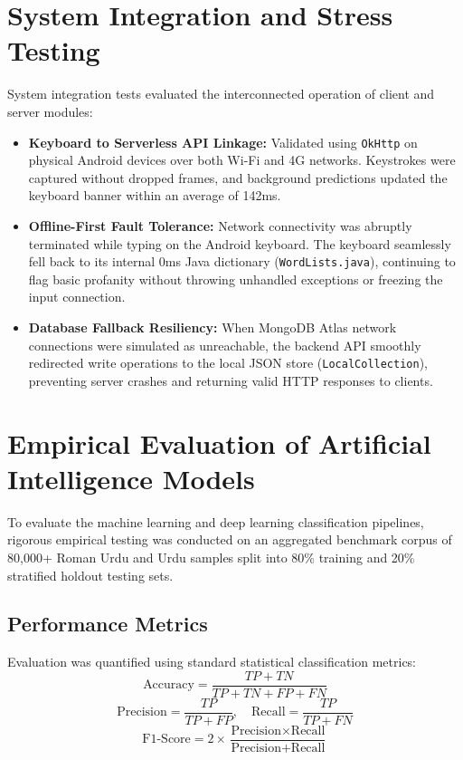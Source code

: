 \documentclass[A4paper,12pt]{report}
\theoremstyle{plain}
\theoremstyle{definition}
\theoremstyle{remark}
\numberwithin{equation}{section}
\begin{document}
\section{System Integration and Stress Testing}
System integration tests evaluated the interconnected operation of client and server modules:
\begin{itemize}[leftmargin=*]
    \item \textbf{Keyboard to Serverless API Linkage:} Validated using \texttt{OkHttp} on physical Android devices over both Wi-Fi and 4G networks. Keystrokes were captured without dropped frames, and background predictions updated the keyboard banner within an average of 142ms.
    \item \textbf{Offline-First Fault Tolerance:} Network connectivity was abruptly terminated while typing on the Android keyboard. The keyboard seamlessly fell back to its internal 0ms Java dictionary (\texttt{WordLists.java}), continuing to flag basic profanity without throwing unhandled exceptions or freezing the input connection.
    \item \textbf{Database Fallback Resiliency:} When MongoDB Atlas network connections were simulated as unreachable, the backend API smoothly redirected write operations to the local JSON store (\texttt{LocalCollection}), preventing server crashes and returning valid HTTP responses to clients.
\end{itemize}

\section{Empirical Evaluation of Artificial Intelligence Models}
To evaluate the machine learning and deep learning classification pipelines, rigorous empirical testing was conducted on an aggregated benchmark corpus of 80,000+ Roman Urdu and Urdu samples split into 80\% training and 20\% stratified holdout testing sets.

\subsection{Performance Metrics}
Evaluation was quantified using standard statistical classification metrics:
\begin{equation}
\text{Accuracy} = \frac{TP + TN}{TP + TN + FP + FN}
\end{equation}
\begin{equation}
\text{Precision} = \frac{TP}{TP + FP}, \quad \text{Recall} = \frac{TP}{TP + FN}
\end{equation}
\begin{equation}
\text{F1-Score} = 2 \times \frac{\text{Precision} \times \text{Recall}}{\text{Precision} + \text{Recall}}
\end{equation}
\end{document}
